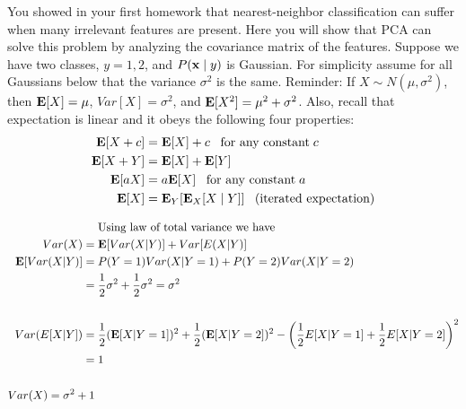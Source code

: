 You showed in your first homework that nearest-neighbor classification
can suffer when many irrelevant features are present.  Here you will
show that PCA can solve this problem by analyzing the covariance
matrix of the features.  Suppose we have two classes, $y = 1, 2$, and
$P(\mathbf{x} \mid y)$ is Gaussian.  For simplicity assume for all Gaussians
below that the variance $\sigma^2$ is the same.  Reminder: If $X \sim
N(\mu,\sigma^2)$, then $\mathbf{E}[X] = \mu$, $Var[X] = \sigma^2$, and
$\mathbf{E}[X^2] = \mu^2 + \sigma^2$.  Also, recall that expectation is linear
and it obeys the following four properties:
\begin{align*}
\mathbf{E}[X + c] =&\; \mathbf{E}[X] + c\;\;\; \textrm{for any constant}\; c \\
\mathbf{E}[X + Y] =&\; \mathbf{E}[X] + \mathbf{E}[Y] \\
\mathbf{E}[aX] =&\; a\mathbf{E}[X]\;\;\; \textrm{for any constant}\; a \\
\mathbf{E}[X] =&\; \mathbf{E}_Y [ \mathbf{E}_X [X \mid Y] ] \;\;\; \textrm{(iterated expectation)}
\end{align*}

\begin{align*}
& \;\text{Using law of total variance we have} \\
Var (X) =&\; \mathbf{E} [Var(X|Y)] + Var[E(X|Y)] \\
\mathbf{E} [Var (X|Y)]= &\; P (Y=1) Var (X|Y=1) + P(Y=2) Var (X | Y =2) \\
= &\; \frac{1}{2} \sigma^2 + \frac{1}{2} \sigma^2 = \sigma^2 \\
\\
Var (E [X|Y]) =&\; \frac{1}{2} (\mathbf{E}[X | Y = 1])^2 + \frac{1}{2} (\mathbf{E} [X|Y=2])^2 - \left( \frac{1}{2} E[X|Y = 1] + \frac{1}{2} E [X|Y = 2] \right)^2 \\
=&\; 1\\
\\
Var(X) = \sigma^2 +1 \\
\end{align*}


